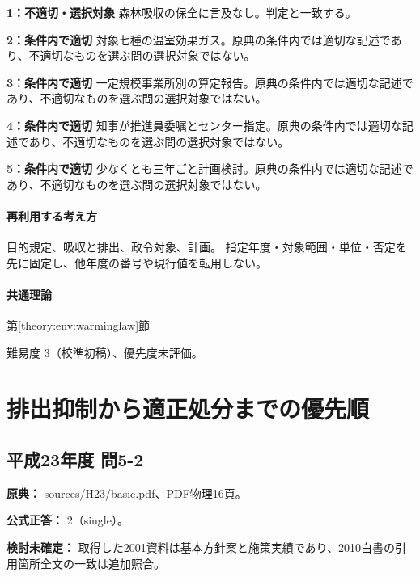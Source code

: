 \noindent\textbf{1：不適切・選択対象} 森林吸収の保全に言及なし。判定と一致する。\par

\noindent\textbf{2：条件内で適切} 対象七種の温室効果ガス。原典の条件内では適切な記述であり、不適切なものを選ぶ問の選択対象ではない。\par

\noindent\textbf{3：条件内で適切} 一定規模事業所別の算定報告。原典の条件内では適切な記述であり、不適切なものを選ぶ問の選択対象ではない。\par

\noindent\textbf{4：条件内で適切} 知事が推進員委嘱とセンター指定。原典の条件内では適切な記述であり、不適切なものを選ぶ問の選択対象ではない。\par

\noindent\textbf{5：条件内で適切} 少なくとも三年ごと計画検討。原典の条件内では適切な記述であり、不適切なものを選ぶ問の選択対象ではない。\par

\paragraph{再利用する考え方} 目的規定、吸収と排出、政令対象、計画。 指定年度・対象範囲・単位・否定を先に固定し、他年度の番号や現行値を転用しない。

\paragraph{共通理論} \hyperref[theory:env:warminglaw]{第\ref*{theory:env:warminglaw}節}

\par 難易度 3（校準初稿）、優先度未評価。

\section{排出抑制から適正処分までの優先順}

\subsection{平成23年度 問5-2}
\label{q:h23-reg-basic-5-2}

\noindent\textbf{原典：} sources/H23/basic.pdf、PDF物理16頁。

\textbf{公式正答：} 2（single）。

\par\textbf{検討未確定：} 取得した2001資料は基本方針案と施策実績であり、2010白書の引用箇所全文の一致は追加照合。

